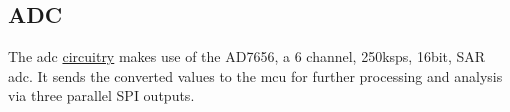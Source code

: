 \subsection{ADC}

The \gls{adc} \hyperlink{sch:adc}{circuitry} makes use of the AD7656, a 6 channel, 250ksps, 16bit, SAR \gls{adc}. It sends the converted values to the \gls{mcu} for further processing and analysis via three parallel SPI outputs.

